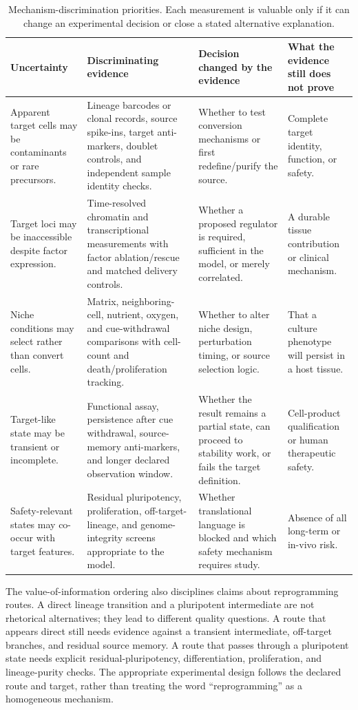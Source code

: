 \documentclass[10pt,conference]{IEEEtran}
\begin{document}
\begin{table}[!t]
\caption{Mechanism-discrimination priorities. Each measurement is valuable only if it can change an experimental decision or close a stated alternative explanation.}
\label{tab:information-priorities}
\centering
\footnotesize
\begin{tabular}{@{}p{}p{}p{}p{}@{}}
\toprule
Uncertainty & Discriminating evidence & Decision changed by the evidence & What the evidence still does not prove \\
\midrule
Apparent target cells may be contaminants or rare precursors. & Lineage barcodes or clonal records, source spike-ins, target anti-markers, doublet controls, and independent sample identity checks. & Whether to test conversion mechanisms or first redefine/purify the source. & Complete target identity, function, or safety. \\
Target loci may be inaccessible despite factor expression. & Time-resolved chromatin and transcriptional measurements with factor ablation/rescue and matched delivery controls. & Whether a proposed regulator is required, sufficient in the model, or merely correlated. & A durable tissue contribution or clinical mechanism. \\
Niche conditions may select rather than convert cells. & Matrix, neighboring-cell, nutrient, oxygen, and cue-withdrawal comparisons with cell-count and death/proliferation tracking. & Whether to alter niche design, perturbation timing, or source selection logic. & That a culture phenotype will persist in a host tissue. \\
Target-like state may be transient or incomplete. & Functional assay, persistence after cue withdrawal, source-memory anti-markers, and longer declared observation window. & Whether the result remains a partial state, can proceed to stability work, or fails the target definition. & Cell-product qualification or human therapeutic safety. \\
Safety-relevant states may co-occur with target features. & Residual pluripotency, proliferation, off-target-lineage, and genome-integrity screens appropriate to the model. & Whether translational language is blocked and which safety mechanism requires study. & Absence of all long-term or in-vivo risk. \\
\bottomrule
\end{tabular}
\end{table}

The value-of-information ordering also disciplines claims about reprogramming routes. A direct lineage transition and a pluripotent intermediate are not rhetorical alternatives; they lead to different quality questions. A route that appears direct still needs evidence against a transient intermediate, off-target branches, and residual source memory. A route that passes through a pluripotent state needs explicit residual-pluripotency, differentiation, proliferation, and lineage-purity checks. The appropriate experimental design follows the declared route and target, rather than treating the word ``reprogramming'' as a homogeneous mechanism.
\end{document}
